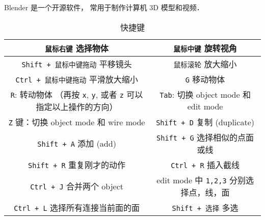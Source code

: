 
\begin{issues}
\issueDraft
\end{issues}

Blender 是一个开源软件， 常用于制作计算机 3D 模型和视频．

\begin{table}[ht]
\centering
\caption{快捷键}\label{Blendr_tab1}
\begin{tabular}{|c|c|}
\hline
\verb|鼠标右键| 选择物体 & \verb|鼠标中键| 旋转视角 \\
\hline
\verb|Shift + 鼠标中键拖动| 平移镜头 & \verb|鼠标滚轮| 放大缩小 \\
\hline
\verb|Ctrl + 鼠标中键拖动| 平滑放大缩小 & \verb|G| 移动物体 \\
\hline
\verb|R|: 转动物体 （再按 \verb|x|, \verb|y|, 或者 \verb|z| 可以指定以上操作的方向） & \verb|Tab|: 切换 object mode 和 edit mode \\
\hline
\verb|Z| 键：切换 object mode 和 wire mode & \verb|Shift + D| 复制 (duplicate) \\
\hline
\verb|Shift + A| 添加 (add) & \verb|Shift + G| 选择相似的点面或线 \\
\hline
\verb|Shift + R| 重复刚才的动作 & \verb|Ctrl + R| 插入截线 \\
\hline
\verb|Ctrl + J| 合并两个 object & edit mode 中 \verb|1,2,3| 分别选择点，线，面\\
\hline
\verb|Ctrl + L| 选择所有连接当前面的面 & \verb|Shift + 选择| 多选
\end{tabular}
\end{table}

